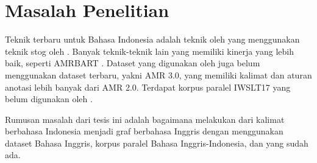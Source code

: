 \section{Masalah Penelitian}

Teknik \crosslingual{} \amrparsing{} terbaru untuk Bahasa Indonesia adalah teknik oleh \textcite{putra2022} yang menggunakan teknik \gls{stog} oleh .
Banyak teknik-teknik lain yang memiliki kinerja \amrparsing{} yang lebih baik, seperti \gls{AMRBART} .
Dataset yang digunakan oleh \textcite{putra2022} juga belum menggunakan dataset terbaru, yakni AMR 3.0, yang memiliki kalimat dan aturan anotasi lebih banyak dari AMR 2.0.
Terdapat korpus paralel IWSLT17  yang belum digunakan oleh \textcite{putra2022}.

Rumusan masalah dari tesis ini adalah bagaimana melakukan \amrparsing{} dari kalimat berbahasa Indonesia menjadi graf \AMR{} berbahasa Inggris dengan menggunakan dataset \AMR{} Bahasa Inggris, korpus paralel Bahasa Inggris-Indonesia, dan \multil{}  yang sudah ada.
